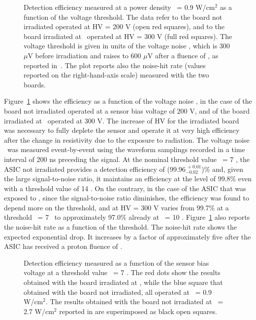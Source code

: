 		\begin{figure}[!htb]
			\centering
			\caption{\label{fig:HV_vs_th} Detection efficiency measured at a power density  \pdensity~= 0.9 W/cm$^2$ as a function of the voltage threshold. The data refer to the board not irradiated operated at HV = 200 V (open red squares), and to the board irradiated at \maxflu~operated at HV = 300 V (full red squares). The voltage threshold is given in units of the voltage noise \sigmav, which is 300 $\mu$V before irradiation and raises to 600 $\mu$V after a fluence of \maxflu, as reported in~\cite{milanesio2023radiation}. The plot reports also the noise-hit rate (values reported on the right-hand-axis scale) measured with the two boards.}
		\end{figure}
		Figure~\ref{fig:HV_vs_th} shows the efficiency as a function of the voltage noise \sigmav, in the case of the board not irradiated operated at a sensor bias voltage of 200 V, and of the board irradiated at \maxflu~operated at 300 V. 
		The increase of HV for the irradiated board was necessary to fully deplete the sensor and operate it at very high efficiency after the change in resistivity due to the exposure to radiation.
		The voltage noise \sigmav~was measured event-by-event using the waveform samplings recorded in a time interval of 200 ns preceding the signal.
		At the nominal threshold value \vth~= 7 \sigmav, the ASIC not irradiated provides a detection efficiency of (99.96$^{~\!+0.01}_{-0.02}$)\% and, given the large signal-to-noise ratio, it maintains an efficiency at the level of 99.8\% even with a threshold value of 14 \sigmav.
		On the contrary,  in the case  of the ASIC that was exposed to \maxflu, since the signal-to-noise ratio diminishes, the efficiency was found to depend more on the threshold, and at HV = 300 V varies from 99.7\% at a threshold \vth~= 7 \sigmav~to approximately 97.0\% already at \vth~= 10 \sigmav. 
		Figure~\ref{fig:HV_vs_th} also reports the noise-hit rate as a function of the threshold. The noise-hit rate  shows the expected  exponential drop. It increases by a factor of approximately five after the ASIC has received a proton fluence of \maxflu.
		\begin{figure}[!htb]
			\centering
			\caption{\label{fig:HV_vs_eff} Detection efficiency measured as a function of the sensor bias voltage at a threshold value \vth~= 7 \sigmav. The red dots show the results obtained with the board irradiated at \maxflu, while the blue square that obtained with the board not irradiated, all  operated at \pdensity~= 0.9 W/cm$^2$. The results obtained with the board not irradiated at \pdensity~= 2.7 W/cm$^2$ reported in \cite{Zambito_2023} are superimposed as black open squares.}
		\end{figure}




